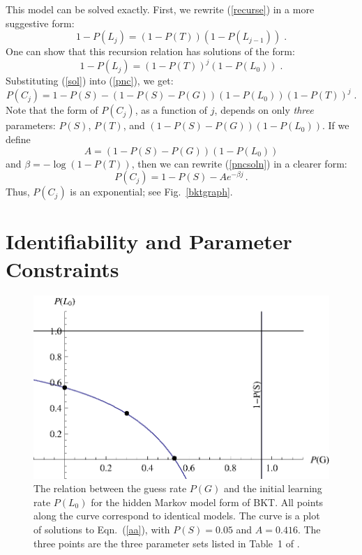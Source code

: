 \documentclass{acmlarge-edm}
\begin{document}
This model can be  solved exactly.  First, we rewrite (\ref{recurse}) 
in a more suggestive form:
%
\begin{equation}
        1-P(L_j) = \left(1-P(T)\right) \left(1-P(L_{j-1})\right) \; .
\end{equation}
%
One can show that this recursion relation has solutions of the form:
%
\begin{equation}
            1-P(L_j) = \left(1-P(T)\right)^j\left(1-P(L_0)\right) \; .
	    \label{sol}
\end{equation}
%
%
Substituting (\ref{sol}) into (\ref{pnc}), we get:
%
\begin{equation}
        P(C_j) = 1-P(S) -\left(1-P(S)-P(G)\right) \left(1-P(L_0)\right)
                   \left(1-P(T)\right)^j \; . \label{pncsoln}
\end{equation}
%
Note that the form of $P(C_j)$, as a function of $j$, 
depends on only {\em three} parameters:  $P(S)$, $P(T)$, and 
$\left(1-P(S)-P(G)\right) \left(1-P(L_0)\right)$.
If we define
%
\begin{equation} 
          A=\left(1-P(S)-P(G)\right) \left(1-P(L_0)\right)  \label{aa}
\end{equation}
%
 and $\beta=-\log(1-P(T))$, then we can rewrite (\ref{pncsoln}) in 
a clearer form:
%
\begin{equation}
         P(C_j) = 1-P(S) -A e^{-\beta j} \, . \label{solnn}
\end{equation}
%
Thus, $P(C_j)$ is an exponential; see Fig.~\ref{bktgraph}.


\section{Identifiability and Parameter Constraints}

\begin{figure}
\centering\includegraphics{table1.eps}
\caption{The relation between the guess rate $P(G)$ and the initial
  learning rate $P(L_0)$ for the hidden
  Markov model form of BKT.  All points along the curve correspond
  to identical models.
  The curve is a plot of solutions to Eqn.~(\ref{aa}), with $P(S)=0.05$ and $A=0.416$.
  The three points are the three parameter sets listed in Table~1 of
  \cite{beck_identifiability:_2007}.
}
 \label{table1}
\end{figure}
\end{document}
